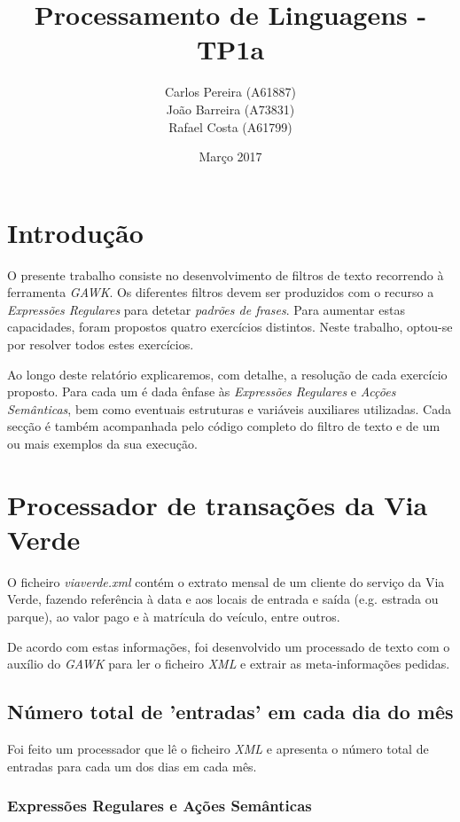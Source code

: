 \documentclass{article}
\title{\textbf{Processamento de Linguagens - TP1a}}
\author{\begin{tabular}{c}
            \textbf{} Carlos Pereira (A61887) \\ João Barreira (A73831) \\ Rafael Costa (A61799)
        \end{tabular}
       }
\date{Março 2017}
\begin{document}
\maketitle

\section{Introdução}

O presente trabalho consiste no desenvolvimento de filtros de texto recorrendo à ferramenta \emph{GAWK}. Os diferentes filtros devem ser produzidos com o recurso a \emph{Expressões Regulares} para detetar \emph{padrões de frases}. Para aumentar estas capacidades, foram propostos quatro exercícios distintos. Neste trabalho, optou-se por resolver todos estes exercícios.

Ao longo deste relatório explicaremos, com detalhe, a resolução de cada exercício proposto. Para cada um é dada ênfase às \emph{Expressões Regulares} e \emph{Acções Semânticas}, bem como eventuais estruturas e variáveis auxiliares utilizadas. Cada secção é também acompanhada pelo código completo do filtro de texto e de um ou mais exemplos da sua execução.



\vspace{15}
\section{Processador de transações da Via Verde}

O ficheiro \emph{viaverde.xml} contém o extrato mensal de um cliente do serviço da Via Verde, fazendo referência à data e aos locais de entrada e saída (e.g. estrada ou parque), ao valor pago e à matrícula do veículo, entre outros.

De acordo com estas informações, foi desenvolvido um processado de texto com o auxílio do \emph{GAWK} para ler o ficheiro \emph{XML} e extrair as meta-informações pedidas.

\subsection{Número total de 'entradas' em cada dia do mês}

Foi feito um processador que lê o ficheiro \emph{XML} e apresenta o número total de entradas para cada um dos dias em cada mês.

\subsubsection{Expressões Regulares e Ações Semânticas}
\end{document}
